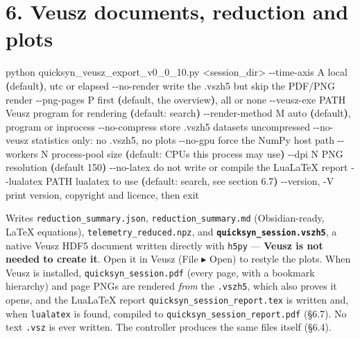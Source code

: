 \documentclass[
\directlua{luaotfload.add_fallback("qsfallback", {"DejaVu Sans:mode=harf;", "DejaVu Sans Mono:mode=harf;", "DejaVu Math TeX Gyre:mode=harf;"})}
  10pt,
  letterpaper,
]{article}
\newenvironment{Shaded}{}{}
\newcommand{\AttributeTok}[1]{\textcolor[rgb]{0.49,0.56,0.16}{#1}}
\newcommand{\ErrorTok}[1]{\textcolor[rgb]{1.00,0.00,0.00}{\textbf{#1}}}
\newcommand{\ExtensionTok}[1]{#1}
\newcommand{\KeywordTok}[1]{\textcolor[rgb]{0.00,0.44,0.13}{\textbf{#1}}}
\newcommand{\NormalTok}[1]{#1}
\newcommand{\OperatorTok}[1]{\textcolor[rgb]{0.40,0.40,0.40}{#1}}
\begin{document}
\hypertarget{veusz-documents-reduction-and-plots}{%
\section{6. Veusz documents, reduction and
plots}\label{veusz-documents-reduction-and-plots}}

\begin{Shaded}
\begin{Highlighting}[]
\ExtensionTok{python}\NormalTok{ quicksyn\_veusz\_export\_v0\_0\_10.py }\OperatorTok{\textless{}}\NormalTok{session\_dir}\OperatorTok{\textgreater{}}
    \ExtensionTok{{-}{-}time{-}axis}\NormalTok{ A      local }\ErrorTok{(}\ExtensionTok{default}\KeywordTok{)}\ExtensionTok{,}\NormalTok{ utc or elapsed}
    \ExtensionTok{{-}{-}no{-}render}\NormalTok{        write the .vszh5 but skip the PDF/PNG render}
    \ExtensionTok{{-}{-}png{-}pages}\NormalTok{ P      first }\ErrorTok{(}\ExtensionTok{default,}\NormalTok{ the overview}\KeywordTok{)}\ExtensionTok{,}\NormalTok{ all or none}
    \ExtensionTok{{-}{-}veusz{-}exe}\NormalTok{ PATH   Veusz program for rendering }\ErrorTok{(}\ExtensionTok{default:}\NormalTok{ search}\KeywordTok{)}
    \ExtensionTok{{-}{-}render{-}method}\NormalTok{ M  auto }\ErrorTok{(}\ExtensionTok{default}\KeywordTok{)}\ExtensionTok{,}\NormalTok{ program or inprocess}
    \ExtensionTok{{-}{-}no{-}compress}\NormalTok{      store .vszh5 datasets uncompressed}
    \ExtensionTok{{-}{-}no{-}veusz}\NormalTok{         statistics only: no .vszh5, no plots}
    \ExtensionTok{{-}{-}no{-}gpu}\NormalTok{           force the NumPy host path}
    \ExtensionTok{{-}{-}workers}\NormalTok{ N        process{-}pool size }\ErrorTok{(}\ExtensionTok{default:}\NormalTok{ CPUs this process may use}\KeywordTok{)}
    \ExtensionTok{{-}{-}dpi}\NormalTok{ N            PNG resolution }\ErrorTok{(}\ExtensionTok{default}\NormalTok{ 150}\KeywordTok{)}
    \ExtensionTok{{-}{-}no{-}latex}\NormalTok{         do not write or compile the LuaLaTeX report}
    \ExtensionTok{{-}{-}lualatex}\NormalTok{ PATH    lualatex to use }\ErrorTok{(}\ExtensionTok{default:}\NormalTok{ search, see section 6.7}\KeywordTok{)}
    \ExtensionTok{{-}{-}version,} \AttributeTok{{-}V}\NormalTok{      print version, copyright and licence, then exit}
\end{Highlighting}
\end{Shaded}

Writes \texttt{reduction\_summary.json}, \texttt{reduction\_summary.md}
(Obsidian-ready, LaTeX equations), \texttt{telemetry\_reduced.npz}, and
\textbf{\texttt{quicksyn\_session.vszh5}}, a native Veusz HDF5 document
written directly with \texttt{h5py} --- \textbf{Veusz is not needed to
create it}. Open it in Veusz (File ▸ Open) to restyle the plots. When
Veusz is installed, \texttt{quicksyn\_session.pdf} (every page, with a
bookmark hierarchy) and page PNGs are rendered \emph{from} the
\texttt{.vszh5}, which also proves it opens, and the LuaLaTeX report
\texttt{quicksyn\_session\_report.tex} is written and, when
\texttt{lualatex} is found, compiled to
\texttt{quicksyn\_session\_report.pdf} (§6.7). No text \texttt{.vsz} is
ever written. The controller produces the same files itself (§6.4).
\end{document}
